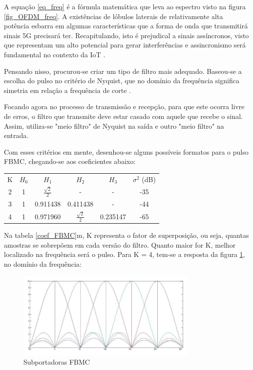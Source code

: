 A equação \ref{eq_freq} é a fórmula matemática que leva ao espectro visto na figura \ref{fig_OFDM_freq}. A existências de lóbulos laterais de relativamente alta potência esbarra em algumas características que a forma de onda que transmitirá sinais 5G precisará ter. Recapitulando, isto é prejudical a sinais assíncronos, visto que representam um alto potencial para gerar interferências e assincronismo será fundamental no contexto da IoT \cite{Wunder}.  
\par Pensando nisso, procurou-se criar um tipo de filtro mais adequado. Baseou-se a escolha do pulso no critério de Nyquist, que no domínio da frequência significa simetria em relação a frequência de corte \cite{Bellanger}. 
\par Focando agora no processo de transmissão e recepção, para que este ocorra livre de erros, o filtro que transmite deve estar casado com aquele que recebe o sinal. Assim, utiliza-se "meio filtro" de Nyquist na saída e outro "meio filtro" na entrada. 
\par Com esses critérios em mente, desenhou-se alguns possíveis formatos para o pulso FBMC, chegando-se aos coeficientes abaixo: 

\begin{center} \label{coef_FBMC}
\begin{tabular}{ c c c c c c  }
 K & $H_{0}$ &  $H_{1}$ & $H_{2}$ & $H_{3}$ & $\sigma^{2}$ (dB) \\ 
 2 & 1 & $\frac{\sqrt{2}}{2}$ & - & - & -35\\  
 3 & 1 & 0.911438 & 0.411438 & - & -44\\
 4 & 1 & 0.971960 & $\frac{\sqrt{2}}{2}$ & 0.235147 & -65
\end{tabular}
\end{center}

Na tabela \ref{coef_FBMC}m, K representa o fator de superposição, ou seja, quantas amostras se sobrepõem em cada versão do filtro. Quanto maior for K, melhor localizado na frequência será o pulso. Para K = 4, tem-se a resposta da figura \ref{fig_FBMC}, no domínio da frequência:

\begin{figure}[h!]
\centering
\includegraphics[width=3.5in]{fig_OFDM_freq.png}
\caption{Subportadoras FBMC}
\label{fig_FBMC}
\end{figure}

